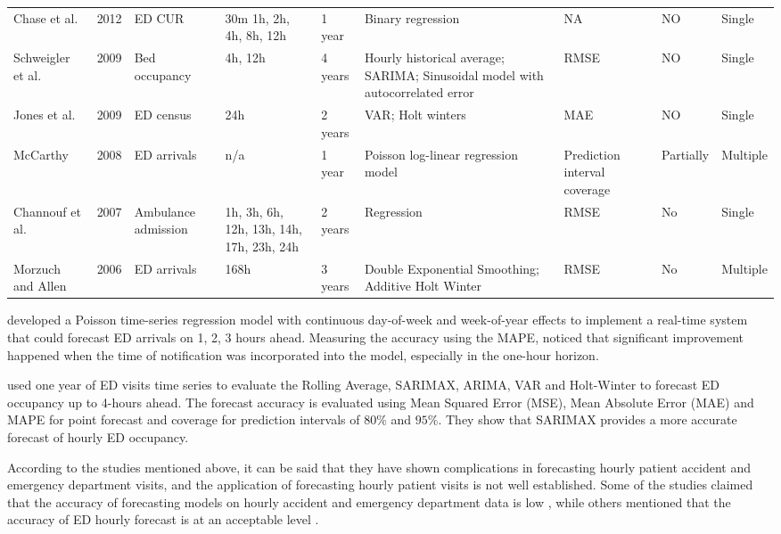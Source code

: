 \documentclass[]{elsarticle} %
\begin{document}
\begin{landscape}
\begin{table}[!h]
{\begin{tabular}[t]{lr>{\raggedright\arraybackslash}p{6em}>{\raggedright\arraybackslash}p{4em}l>{\raggedright\arraybackslash}p{10em}>{\raggedright\arraybackslash}p{8em}ll}
Chase et al. & 2012 & ED CUR & 30m
1h, 2h, 4h, 8h, 12h & 1 year & Binary regression & NA & NO & Single\\
Schweigler et al. & 2009 & Bed occupancy & 4h, 12h & 4 years & Hourly historical average; SARIMA; Sinusoidal model with autocorrelated error & RMSE & NO & Single\\
Jones et al. & 2009 & ED census & 24h & 2 years & VAR;  Holt winters & MAE & NO & Single\\
McCarthy & 2008 & ED arrivals & n/a & 1 year & Poisson log-linear regression model & Prediction interval coverage & Partially & Multiple\\
Channouf et al. & 2007 & Ambulance admission & 1h, 3h, 6h, 12h, 13h, 14h, 17h, 23h, 24h & 2 years & Regression & RMSE & No & Single\\
Morzuch and Allen & 2006 & ED arrivals & 168h & 3 years & Double Exponential Smoothing; Additive Holt Winter & RMSE & No & Multiple\\
\bottomrule
\end{tabular}}
\end{table}
\end{landscape}

\citet{asheim2019real} developed a Poisson time-series regression model with
continuous day-of-week and week-of-year effects to implement a real-time
system that could forecast ED arrivals on 1, 2, 3 hours ahead. Measuring
the accuracy using the MAPE, \citet{asheim2019real} noticed that significant
improvement happened when the time of notification was incorporated into
the model, especially in the one-hour horizon.

\citet{cheng2021forecasting} used one year of ED visits time series to evaluate
the Rolling Average, SARIMAX, ARIMA, VAR and Holt-Winter to forecast ED
occupancy up to 4-hours ahead. The forecast accuracy is evaluated using
Mean Squared Error (MSE), Mean Absolute Error (MAE) and MAPE for point
forecast and coverage for prediction intervals of \(80\%\) and \(95\%\).
They show that SARIMAX provides a more accurate forecast of hourly ED
occupancy.

According to the studies mentioned above, it can be said that they have
shown complications in forecasting hourly patient accident and emergency
department visits, and the application of forecasting hourly patient
visits is not well established. Some of the studies claimed that the
accuracy of forecasting models on hourly accident and emergency
department data is low \citep{boyle2012predicting, hertzum2017forecasting},
while others mentioned that the accuracy of ED hourly forecast is at an
acceptable level \citep{choudhury2020forecasting, mccarthy2008challenge, schweigler2009forecasting}.
\end{document}
